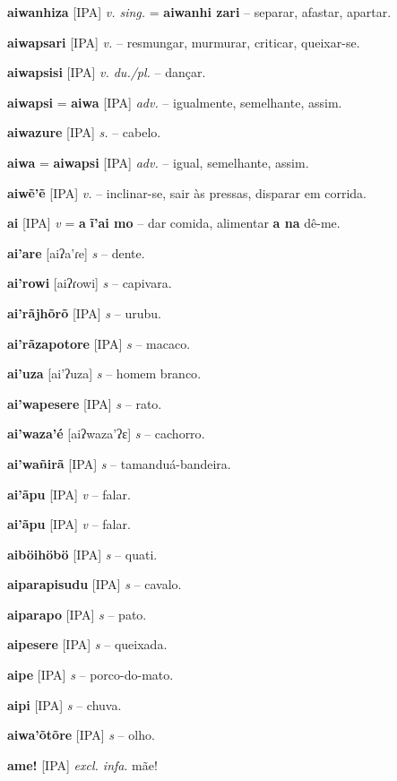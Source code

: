 \textbf{aiwanhiza} [IPA] \textit{v. sing.} = \textbf{aiwanhi zari} -- separar, afastar, apartar.

\textbf{aiwapsari} [IPA] \textit{v.} -- resmungar, murmurar, criticar, queixar-se.

\textbf{aiwapsisi} [IPA] \textit{v. du./pl.} -- dançar.

\textbf{aiwapsi} = \textbf{aiwa} [IPA] \textit{adv.} -- igualmente, semelhante, assim.

\textbf{aiwazure} [IPA] \textit{s.} -- cabelo.

\textbf{aiwa} = \textbf{aiwapsi} [IPA] \textit{adv.} -- igual, semelhante, assim.

\textbf{aiwẽ'ẽ} [IPA] \textit{v.} -- inclinar-se, sair às pressas, disparar em corrida.

\textbf{ai} [IPA] \textit{v} = \textbf{a}  \textbf{ĩ'ai mo} -- dar comida, alimentar  \textbf{a na} dê-me.

\textbf{ai'are} [aiʔa'ɾe] \textit{s} -- {dente}.

\textbf{ai'rowi} [aiʔɾowi] \textit{s} -- {capivara}.

\textbf{ai'rãjhõrõ} [IPA] \textit{s} -- {urubu}.

\textbf{ai'rãzapotore} [IPA] \textit{s} -- {macaco}.

\textbf{ai'uza} [ai'ʔuza] \textit{s} -- {homem branco}.

\textbf{ai'wapesere} [IPA] \textit{s} -- {rato}.

\textbf{ai'waza'é} [aiʔwaza'ʔɛ] \textit{s} -- {cachorro}.

\textbf{ai'wañirã} [IPA] \textit{s} -- {tamanduá-bandeira}.

\textbf{ai'ãpu} [IPA] \textit{v} -- {falar}.

\textbf{ai'ãpu} [IPA] \textit{v} -- {falar}.

\textbf{aiböihöbö} [IPA] \textit{s} -- {quati}.

\textbf{aiparapisudu} [IPA] \textit{s} -- {cavalo}.

\textbf{aiparapo} [IPA] \textit{s} -- {pato}.

\textbf{aipesere} [IPA] \textit{s} -- {queixada}.

\textbf{aipe} [IPA] \textit{s} -- {porco-do-mato}.

\textbf{aipi} [IPA] \textit{s} -- {chuva}.

\textbf{aiwa'õtõre} [IPA] \textit{s} -- {olho}.

\textbf{ame!} [IPA] \textit{excl. infa}. mãe!


